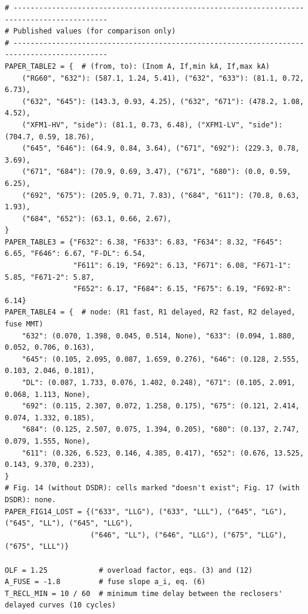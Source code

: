 \documentclass[12pt,a4paper]{article}
\begin{document}
\begin{lstlisting}
# --------------------------------------------------------------------------------------------
# Published values (for comparison only)
# --------------------------------------------------------------------------------------------
PAPER_TABLE2 = {  # (from, to): (Inom A, If,min kA, If,max kA)
    ("RG60", "632"): (587.1, 1.24, 5.41), ("632", "633"): (81.1, 0.72, 6.73),
    ("632", "645"): (143.3, 0.93, 4.25), ("632", "671"): (478.2, 1.08, 4.52),
    ("XFM1-HV", "side"): (81.1, 0.73, 6.48), ("XFM1-LV", "side"): (704.7, 0.59, 18.76),
    ("645", "646"): (64.9, 0.84, 3.64), ("671", "692"): (229.3, 0.78, 3.69),
    ("671", "684"): (70.9, 0.69, 3.47), ("671", "680"): (0.0, 0.59, 6.25),
    ("692", "675"): (205.9, 0.71, 7.83), ("684", "611"): (70.8, 0.63, 1.93),
    ("684", "652"): (63.1, 0.66, 2.67),
}
PAPER_TABLE3 = {"F632": 6.38, "F633": 6.83, "F634": 8.32, "F645": 6.65, "F646": 6.67, "F-DL": 6.54,
                "F611": 6.19, "F692": 6.13, "F671": 6.08, "F671-1": 5.85, "F671-2": 5.87,
                "F652": 6.17, "F684": 6.15, "F675": 6.19, "F692-R": 6.14}
PAPER_TABLE4 = {  # node: (R1 fast, R1 delayed, R2 fast, R2 delayed, fuse MMT)
    "632": (0.070, 1.398, 0.045, 0.514, None), "633": (0.094, 1.880, 0.052, 0.706, 0.163),
    "645": (0.105, 2.095, 0.087, 1.659, 0.276), "646": (0.128, 2.555, 0.103, 2.046, 0.181),
    "DL": (0.087, 1.733, 0.076, 1.402, 0.248), "671": (0.105, 2.091, 0.068, 1.113, None),
    "692": (0.115, 2.307, 0.072, 1.258, 0.175), "675": (0.121, 2.414, 0.074, 1.332, 0.185),
    "684": (0.125, 2.507, 0.075, 1.394, 0.205), "680": (0.137, 2.747, 0.079, 1.555, None),
    "611": (0.326, 6.523, 0.146, 4.385, 0.417), "652": (0.676, 13.525, 0.143, 9.370, 0.233),
}
# Fig. 14 (without DSDR): cells marked "doesn't exist"; Fig. 17 (with DSDR): none.
PAPER_FIG14_LOST = {("633", "LLG"), ("633", "LLL"), ("645", "LG"), ("645", "LL"), ("645", "LLG"),
                    ("646", "LL"), ("646", "LLG"), ("675", "LLG"), ("675", "LLL")}

OLF = 1.25            # overload factor, eqs. (3) and (12)
A_FUSE = -1.8         # fuse slope a_i, eq. (6)
T_RECL_MIN = 10 / 60  # minimum time delay between the reclosers' delayed curves (10 cycles)
\end{lstlisting}
\end{document}
